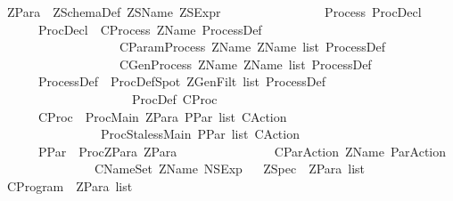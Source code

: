 \begin{isabellebody}
\isamarkupfalse%
\ ZPara\ {\isacharequal}\ ZSchemaDef\ ZSName\ ZSExpr\isanewline
\ \ \ \ \ \ \ \ \ \ \ \ \ \ \ {\isacharbar}\ Process\ ProcDecl\isanewline
{}\ \ \ \ \ \ ProcDecl\ {\isacharequal}\ CProcess\ ZName\ ProcessDef\isanewline
\ \ \ \ \ \ \ \ \ \ \ \ \ \ \ \ \ \ {\isacharbar}\ CParamProcess\ ZName\ {\isachardoublequoteopen}ZName\ list{\isachardoublequoteclose}\ ProcessDef\isanewline
\ \ \ \ \ \ \ \ \ \ \ \ \ \ \ \ \ \ {\isacharbar}\ CGenProcess\ ZName\ {\isachardoublequoteopen}ZName\ list{\isachardoublequoteclose}\ ProcessDef\isanewline
{}\ \ \ \ \ \ ProcessDef\ {\isacharequal}\ ProcDefSpot\ {\isachardoublequoteopen}ZGenFilt\ list{\isachardoublequoteclose}\ ProcessDef\isanewline
\ \ \ \ \ \ \ \ \ \ \ \ \ \ \ \ \ \ \ \ {\isacharbar}\ ProcDef\ CProc\isanewline
{}\ \ \ \ \ \ CProc\ {\isacharequal}\ ProcMain\ ZPara\ {\isachardoublequoteopen}PPar\ list{\isachardoublequoteclose}\ CAction\isanewline
\ \ \ \ \ \ \ \ \ \ \ \ \ \ \ {\isacharbar}\ ProcStalessMain\ {\isachardoublequoteopen}PPar\ list{\isachardoublequoteclose}\ CAction\isanewline
{}\ \ \ \ \ \ PPar\ {\isacharequal}\ ProcZPara\ ZPara\isanewline
\ \ \ \ \ \ \ \ \ \ \ \ \ \ {\isacharbar}\ CParAction\ ZName\ ParAction\isanewline
\ \ \ \ \ \ \ \ \ \ \ \ \ \ {\isacharbar}\ CNameSet\ ZName\ NSExp\isanewline
\ \isanewline
{}\isamarkupfalse%
\ ZSpec\ {\isacharequal}\ {\isachardoublequoteopen}ZPara\ list{\isachardoublequoteclose}\isanewline
\ \isanewline
{}\isamarkupfalse%
\ CProgram\ {\isacharequal}\ {\isachardoublequoteopen}ZPara\ list{\isachardoublequoteclose}\isanewline
%
\isadelimtheory
\isanewline
%
\endisadelimtheory
%
\isatagtheory
{}\isamarkupfalse%
%
\endisatagtheory
{\isafoldtheory}%
%
\isadelimtheory
%
\endisadelimtheory
\end{isabellebody}%
